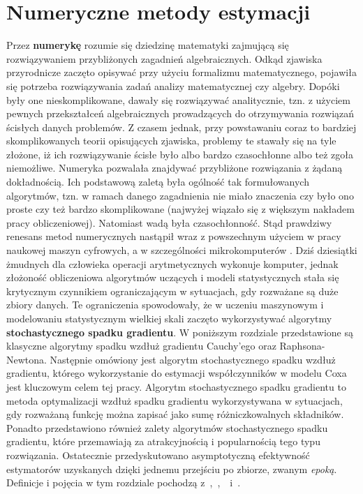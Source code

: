 \chapter{Numeryczne metody estymacji}

Przez \textbf{numerykę} rozumie się dziedzinę matematyki
zajmującą się rozwiązywaniem przybliżonych zagadnień algebraicznych. Odkąd zjawiska przyrodnicze zaczęto opisywać przy użyciu formalizmu matematycznego,
pojawiła się potrzeba rozwiązywania zadań analizy matematycznej czy algebry. Dopóki były
one nieskomplikowane, dawały się rozwiązywać analitycznie, tzn. z użyciem pewnych
przekształceń algebraicznych prowadzących do otrzymywania rozwiązań ścisłych danych
problemów. Z czasem jednak, przy powstawaniu coraz to bardziej skomplikowanych teorii
opisujących zjawiska, problemy te stawały się na tyle złożone, iż ich rozwiązywanie ścisłe
było albo bardzo czasochłonne albo też zgoła niemożliwe. Numeryka pozwalała znajdywać
przybliżone rozwiązania z żądaną dokładnością. Ich podstawową zaletą była ogólność tak
formułowanych algorytmów, tzn. w ramach danego zagadnienia nie miało znaczenia czy było
ono proste czy też bardzo skomplikowane (najwyżej wiązało się z większym nakładem pracy
obliczeniowej). Natomiast wadą była czasochłonność. Stąd prawdziwy renesans metod
numerycznych nastąpił wraz z powszechnym użyciem w pracy naukowej maszyn cyfrowych,
a w szczególności mikrokomputerów \cite{milewski}. Dziś dziesiątki żmudnych dla człowieka operacji
arytmetycznych wykonuje komputer, jednak złożoność obliczeniowa algorytmów uczących i modeli statystycznych stała się krytycznym czynnikiem ograniczającym w sytuacjach, gdy rozważane są duże zbiory danych. Te ograniczenia spowodowały, że w uczeniu maszynowym i modelowaniu statystycznym wielkiej skali zaczęto wykorzystywać algorytmy \textbf{stochastycznego spadku gradientu}. W poniższym rozdziale przedstawione są klasyczne algorytmy spadku wzdłuż gradientu Cauchy'ego oraz Raphsona-Newtona. Następnie omówiony jest algorytm stochastycznego spadku wzdłuż gradientu, którego wykorzystanie do estymacji współczynników w modelu Coxa jest kluczowym celem tej pracy. Algorytm stochastycznego spadku gradientu to metoda optymalizacji wzdłuż spadku gradientu wykorzystywana w sytuacjach, gdy rozważaną funkcję można zapisać jako sumę różniczkowalnych składników. Ponadto przedstawiono również zalety algorytmów stochastycznego spadku gradientu, które przemawiają za atrakcyjnością i popularnością tego typu rozwiązania. Ostatecznie przedyskutowano asymptotyczną efektywność estymatorów uzyskanych dzięki jednemu przejściu po zbiorze, zwanym \textit{epoką}. Definicje i pojęcia w tym rozdziale pochodzą z~\cite{bott1},~\cite{bott2},~\cite{kotlowski}~i~\cite{fortuna}.

